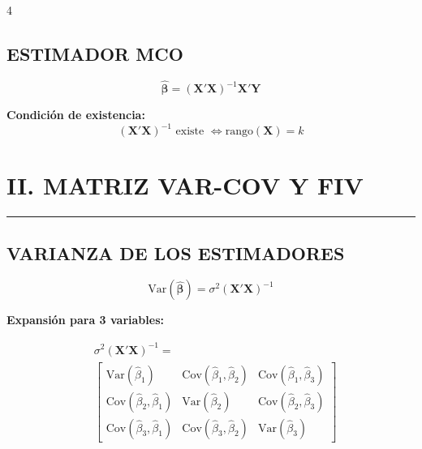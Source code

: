 \documentclass[6pt, landscape]{extarticle}
\newcommand{\sectionline}{%
  \nopagebreak\vspace{-4pt}\noindent\textcolor{GoldLeaf}{\rule{\linewidth}{1pt}}\par\vspace{2pt}%
}
\newcommand{\Var}{\text{Var}}
\newcommand{\Cov}{\text{Cov}}
\newcommand{\Xmat}{\mathbf{X}}
\newcommand{\Ymat}{\mathbf{Y}}
\newcommand{\betahat}{\hat{\boldsymbol{\beta}}}
\begin{document}
\begin{multicols*}{4}
\subsection{ESTIMADOR MCO}

\begin{formulabox}
\vspace{-3pt}
$$\betahat = (\Xmat'\Xmat)^{-1}\Xmat'\Ymat$$
\vspace{-3pt}
\end{formulabox}

\textbf{Condición de existencia:}
$$(\Xmat'\Xmat)^{-1} \text{ existe } \iff \text{rango}(\Xmat) = k$$


\section{II. MATRIZ VAR-COV Y FIV}
\sectionline

\subsection{VARIANZA DE LOS ESTIMADORES}

\begin{formulabox}
\vspace{-3pt}
$$\Var(\betahat) = \sigma^2(\Xmat'\Xmat)^{-1}$$
\vspace{-3pt}
\end{formulabox}

\textbf{Expansión para 3 variables:}
\begin{formulabox}
\vspace{-3pt}
{\scriptsize
$$
\begin{aligned}
&\sigma^2(\Xmat'\Xmat)^{-1} = \\
&\begin{bmatrix}
\Var(\hat{\beta}_1) & \Cov(\hat{\beta}_1,\hat{\beta}_2) & \Cov(\hat{\beta}_1,\hat{\beta}_3) \\
\Cov(\hat{\beta}_2,\hat{\beta}_1) & \Var(\hat{\beta}_2) & \Cov(\hat{\beta}_2,\hat{\beta}_3) \\
\Cov(\hat{\beta}_3,\hat{\beta}_1) & \Cov(\hat{\beta}_3,\hat{\beta}_2) & \Var(\hat{\beta}_3)
\end{bmatrix}
\end{aligned}
$$
}
\vspace{-3pt}
\end{formulabox}



\end{multicols*}
\end{document}

